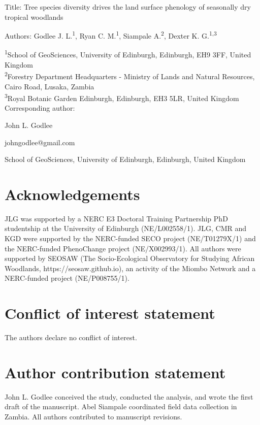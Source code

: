 \documentclass[11pt,a4paper]{article}
\begin{document}
{\Large{Title: Tree species diversity drives the land surface phenology of seasonally dry tropical woodlands}}

Authors: Godlee J. L.\textsuperscript{1}, Ryan C. M.\textsuperscript{1}, Siampale A.\textsuperscript{2}, Dexter K. G.\textsuperscript{1,3}

\textsuperscript{1}School of GeoSciences, University of Edinburgh, Edinburgh, EH9 3FF, United Kingdom \\
\textsuperscript{2}Forestry Department Headquarters - Ministry of Lands and Natural Resources, Cairo Road, Lusaka, Zambia \\
\textsuperscript{3}Royal Botanic Garden Edinburgh, Edinburgh, EH3 5LR, United Kingdom \\

\vspace{1em}
Corresponding author:

John L. Godlee

johngodlee@gmail.com

School of GeoSciences, University of Edinburgh, Edinburgh, United Kingdom

\section*{Acknowledgements}

JLG was supported by a NERC E3 Doctoral Training Partnership PhD studentship at
the University of Edinburgh (NE/L002558/1). JLG, CMR and KGD were supported by
the NERC-funded SECO project (NE/T01279X/1) and the NERC-funded PhenoChange
project (NE/X002993/1). All authors were supported by SEOSAW (The
Socio-Ecological Observatory for Studying African Woodlands,
https://seosaw.github.io), an activity of the Miombo Network and a NERC-funded
project (NE/P008755/1). 

\section*{Conflict of interest statement}

The authors declare no conflict of interest. 

\section*{Author contribution statement}

John L. Godlee conceived the study, conducted the analysis, and wrote the first draft of
the manuscript. Abel Siampale coordinated field data collection in Zambia. All authors
contributed to manuscript revisions. 
\end{document}
